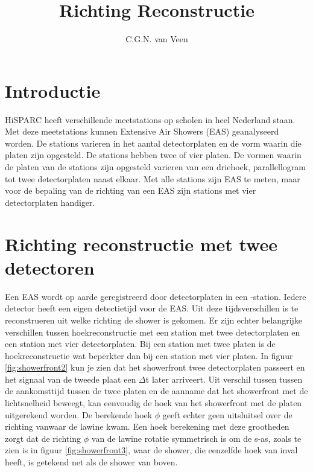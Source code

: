 



\title{Richting Reconstructie}
\author{C.G.N. van Veen} 
\date{}

\maketitle

\section{Introductie}

HiSPARC heeft verschillende meetstations op scholen in heel Nederland staan. 
Met deze meetstations kunnen Extensive Air Showers (EAS) geanalyseerd worden.
De stations varieren in het aantal detectorplaten en de vorm waarin
die platen zijn opgesteld. De  stations hebben twee of vier platen.
De vormen waarin de platen van de stations zijn opgesteld varieren van een driehoek,
parallellogram tot twee detectorplaten naast elkaar. Met alle stations zijn EAS te meten, 
maar voor de bepaling van de richting van een EAS zijn 
stations met vier detectorplaten handiger.
  
\section{Richting reconstructie met twee detectoren}

Een EAS wordt op aarde geregistreerd door detectorplaten in een \hisparc-station. 
Iedere detector heeft een eigen detectietijd voor de EAS. Uit deze tijdsverschillen is te reconstrueren uit welke richting 
de shower is gekomen. Er zijn echter belangrijke verschillen tussen hoekreconstructie met een station met twee
 detectorplaten en een station met vier detectorplaten. 
Bij een station met twee platen is de hoekreconstructie wat beperkter dan bij een station met vier platen.
In figuur \ref{fig:showerfront2} kun je zien dat het showerfront twee detectorplaten passeert en het signaal van de tweede plaat  een $\Delta$t later arriveert. 
Uit verschil tussen tussen de aankomsttijd tussen de twee platen en de aanname dat het showerfront met de lichtsnelheid beweegt,
 kan eenvoudig de hoek van het showerfront met de platen uitgerekend worden. De berekende hoek $\phi$ geeft echter geen uitsluitsel over de richting vanwaar de lawine kwam.
 Een hoek berekening met deze grootheden zorgt dat de richting $\phi$ van de lawine rotatie symmetrisch is om de s-as, zoals te zien is in figuur \ref{fig:showerfront3}, 
waar de shower, die eenzelfde hoek van inval heeft,  is getekend net als de shower van boven. 

